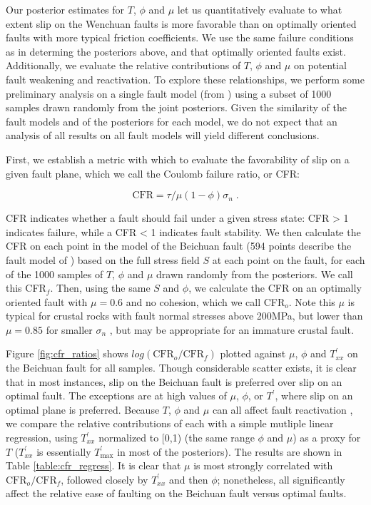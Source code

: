 \documentclass[twocolumn,jgrga]{AGUTeX}
\begin{document}
\begin{article}
Our posterior estimates for $T$, $\phi$ and $\mu$ let us quantitatively
evaluate to what extent slip on the Wenchuan faults is more favorable
than on optimally oriented faults with more typical friction
coefficients. We use the same failure conditions as in determing the
posteriors above, and that optimally oriented faults exist.
Additionally, we evaluate the relative contributions of $T$, $\phi$ and
$\mu$ on potential fault weakening and reactivation. To explore these
relationships, we perform some preliminary analysis on a single fault
model (from \citet{zhang2011}) using a subset of 1000
samples drawn randomly from the joint posteriors. Given the similarity
of the fault models and of the posteriors for each model, we do not
expect that an analysis of all results on all fault models will yield
different conclusions.

First, we establish a metric with which to evaluate the favorability of
slip on a given fault plane, which we call the Coulomb failure ratio, or
CFR:

\begin{equation}
\mathrm{CFR} = \tau / \mu (1 - \phi) \sigma_n \; .
\label{eqn:cfr}
\end{equation}

CFR indicates whether a fault should fail under a given stress state:
CFR \textgreater{} 1 indicates failure, while a CFR \textless{} 1
indicates fault stability. We then calculate the CFR on each point in
the model of the Beichuan fault (594 points describe the fault model of
\citet{zhang2011}) based on the full stress field $S$ at
each point on the fault, for each of the 1000 samples of $T$, $\phi$ and
$\mu$ drawn randomly from the posteriors. We call this CFR$_f$. Then,
using the same $S$ and $\phi$, we calculate the CFR on an optimally
oriented fault with $\mu=0.6$ and no cohesion, which we call CFR$_o$.
Note this $\mu$ is typical for crustal rocks with fault normal stresses
above 200MPa, but lower than $\mu = 0.85$ for smaller $\sigma_n$
\citep{byerlee1978}, but may be appropriate for an immature crustal
fault.

Figure \ref{fig:cfr_ratios} shows
$log (\mathrm{CFR}_o / \mathrm{CFR}_f)$ plotted against $\mu$, $\phi$
and $T^\prime_{xx}$ on the Beichuan fault for all samples. Though
considerable scatter exists, it is clear that in most instances, slip on
the Beichuan fault is preferred over slip on an optimal fault. The
exceptions are at high values of $\mu$, $\phi$, or $T^\prime$, where
slip on an optimal plane is preferred. Because $T$, $\phi$ and $\mu$ can
all affect fault reactivation \citep[e.g.,][]{sibson1985}, we compare the
relative contributions of each with a simple mutliple linear regression,
using $T^\prime_{xx}$ normalized to [0,1) (the same range $\phi$ and
$\mu$) as a proxy for $T$ ($T^\prime_{xx}$ is essentially
$T^\prime_{\mathrm{max}}$ in most of the posteriors). The results are
shown in Table \ref{table:cfr_regress}. It is clear that $\mu$ is most
strongly correlated with $\mathrm{CFR}_o/\mathrm{CFR}_f$, followed
closely by $T^\prime_{xx}$ and then $\phi$; nonetheless, all
significantly affect the relative ease of faulting on the Beichuan fault
versus optimal faults.


\end{article}
\end{document}
